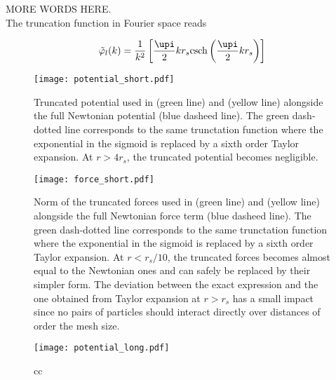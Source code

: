 MORE WORDS HERE.\\

The truncation function in Fourier space reads

\begin{equation}
  \tilde\varphi_l(k) =
  \frac{1}{k^2}\left[\frac{\upi}{2}kr_s\textrm{csch}\left(\frac{\upi}{2}kr_s\right)
    \right]
\end{equation}

\begin{figure}
\texttt{[image: potential\_short.pdf]}
\caption{Truncated potential used in \swift (green line) and \gadget
  (yellow line) alongside the full Newtonian potential (blue dasheed
  line). The green dash-dotted line corresponds to the same
  trunctation function where the exponential in the sigmoid is
  replaced by a sixth order Taylor expansion. At $r>4r_s$, the
  truncated potential becomes negligible.}
\label{fig:fmm:potential_short}
\end{figure}



\begin{figure}
\texttt{[image: force\_short.pdf]}
\caption{Norm of the truncated forces used in \swift (green line) and
  \gadget (yellow line) alongside the full Newtonian force term (blue
  dasheed line). The green dash-dotted line corresponds to the same
  trunctation function where the exponential in the sigmoid is
  replaced by a sixth order Taylor expansion. At $r<r_s/10$, the
  truncated forces becomes almost equal to the Newtonian ones and can
  safely be replaced by their simpler form. The deviation between the
  exact expression and the one obtained from Taylor expansion at
  $r>r_s$ has a small impact since no pairs of particles should
  interact directly over distances of order the mesh size. }
\label{fig:fmm:force_short}
\end{figure}


\begin{figure}
\texttt{[image: potential\_long.pdf]}
\caption{cc}
\label{fig:fmm:potential_long}
\end{figure}
